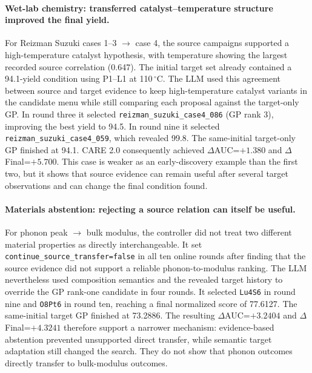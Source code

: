 \paragraph{Wet-lab chemistry: transferred catalyst--temperature structure improved the final yield.}
For Reizman Suzuki cases 1--3 $\rightarrow$ case 4, the source campaigns
supported a high-temperature catalyst hypothesis, with temperature showing the
largest recorded source correlation (0.647). The initial target set already
contained a 94.1-yield condition using P1--L1 at 110\,$^\circ$C. The LLM used
this agreement between source and target evidence to keep high-temperature
catalyst variants in the candidate menu while still comparing each proposal
against the target-only GP. In round three it selected
\texttt{reizman\_suzuki\_case4\_086} (GP rank 3), improving the best yield to
94.5. In round nine it selected
\texttt{reizman\_suzuki\_case4\_059}, which revealed 99.8. The same-initial
target-only GP finished at 94.1. CARE 2.0 consequently achieved
$\Delta$AUC=$+1.380$ and $\Delta$Final=$+5.700$. This case is weaker as an
early-discovery example than the first two, but it shows that source evidence
can remain useful after several target observations and can change the final
condition found.

\paragraph{Materials abstention: rejecting a source relation can itself be useful.}
For phonon peak $\rightarrow$ bulk modulus, the controller did not treat two
different material properties as directly interchangeable. It set
\texttt{continue\_source\_transfer=false} in all ten online rounds after finding
that the source evidence did not support a reliable phonon-to-modulus ranking.
The LLM nevertheless used composition semantics and the revealed target history
to override the GP rank-one candidate in four rounds. It selected
\texttt{Lu4S6} in round nine and \texttt{O8Pt6} in round ten, reaching a final
normalized score of 77.6127. The same-initial target GP finished at 73.2886.
The resulting $\Delta$AUC=$+3.2404$ and $\Delta$Final=$+4.3241$ therefore support
a narrower mechanism: evidence-based abstention prevented unsupported direct
transfer, while semantic target adaptation still changed the search. They do
not show that phonon outcomes directly transfer to bulk-modulus outcomes.

